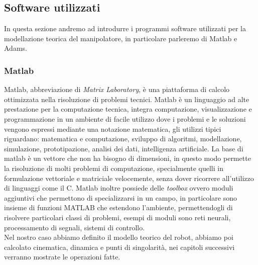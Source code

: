 \subsection{Software utilizzati}
In questa sezione andremo ad introdurre i programmi software utilizzati per la modellazione teorica del manipolatore, in particolare parleremo di Matlab e Adams.
\subsubsection{Matlab}
Matlab, abbreviazione di \textit{Matrix Laboratory}, è una piattaforma di calcolo ottimizzata nella risoluzione di problemi tecnici. 
Matlab è un linguaggio ad alte prestazione per la computazione tecnica, integra computazione, visualizzazione e programmazione in un ambiente di facile utilizzo dove i problemi e le soluzioni vengono espressi mediante una notazione matematica, gli utilizzi tipici riguardano: matematica e computazione, sviluppo di algoritmi, modellazione, simulazione, prototipazione, analisi dei dati, intelligenza artificiale. La base di matlab è un vettore che non ha bisogno di dimensioni, in questo modo permette la risoluzione di molti problemi di computazione, specialmente quelli in formulazione vettoriale e matriciale velocemente, senza dover ricorrere all'utilizzo di linguaggi come il C. Matlab inoltre possiede delle \textit{toolbox} ovvero moduli aggiuntivi che permettono di specializzarsi in un campo, in particolare sono insieme di funzioni MATLAB che estendono l'ambiente, permettendogli di risolvere particolari classi di problemi, esempi di moduli sono reti neurali, processamento di segnali, sistemi di controllo.
\\Nel nostro caso abbiamo definito il modello teorico del robot, abbiamo poi calcolato cinematica, dinamica e punti di singolarità, nei capitoli successivi verranno mostrate le operazioni fatte. 
